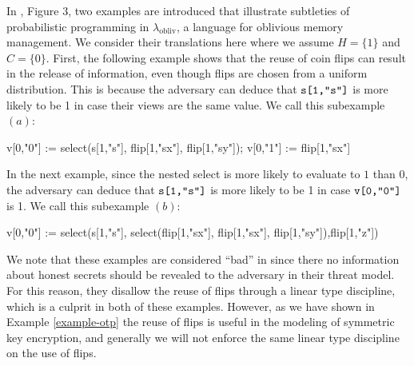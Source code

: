 \begin{example}
  \label{example-lambda-obliv}
  In \cite{darais2019language}, Figure 3, two examples are introduced that illustrate
  subtleties of probabilistic programming in
  $\lambda_{\mathrm{obliv}}$, a language for oblivious memory
  management. We consider their translations here where we
  assume $H = \{ 1 \}$ and $C = \{ 0 \}$. First, the following
  example shows that the reuse of coin flips can result in the release of
  information, even though flips are chosen from a uniform
  distribution. This is because the adversary can deduce that
  $\texttt{s[1,"s"]}$ is more likely to be 1 in case their views are the
  same value. We call this subexample $(a)$:
  {\small
    \begin{verbatimtab}
    v[0,"0"] := select(s[1,"s"], flip[1,"sx"], flip[1,"sy"]);
    v[0,"1"] := flip[1,"sx"] \end{verbatimtab}
  }
  In the next example, since the nested select is more likely to evaluate
  to $1$ than $0$, the adversary can deduce that $\texttt{s[1,"s"]}$ is
  more likely to be 1 in case $\texttt{v[0,"0"]}$ is 1. We call this subexample $(b)$:
  {\small
    \begin{verbatimtab}
  v[0,"0"] := select(s[1,"s"], 
  select(flip[1,"sx"], flip[1,"sx"], flip[1,"sy"]),flip[1,"z"]) \end{verbatimtab}
  }
  We note that these examples are considered ``bad'' in \cite{darais2019language} since there
  no information about honest secrets should be revealed to the adversary in
  their threat model. For this reason, they disallow the reuse of flips through a
  linear type discipline, which is a culprit in both of these examples. However,
  as we have shown in Example \ref{example-otp} the reuse of flips is useful in
  the modeling of symmetric key encryption, and generally we will not enforce
  the same linear type discipline on the use of flips.
\end{example}

